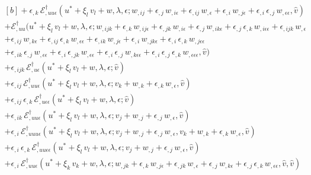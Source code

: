 \documentclass[12pt, final]{scrartcl}
\theoremstyle{definition}
\newcommand{\EE}{\mathcal E ^ \dagger}
\begin{document}
\begin{equation}
\begin{aligned}[b]
    + \epsilon_{,k} \, \EE_{,uu\epsilon}(u^\ast + \xi_l \, v_l + w, \lambda, \epsilon; w_{,ij} + \epsilon_{,j} \, w_{,i\epsilon} + \epsilon_{,ij} \, w_{,\epsilon} + \epsilon_{,i} \, w_{,j\epsilon} + \epsilon_{,i} \, \epsilon_{,j} \, w_{,\epsilon\epsilon} , \hat{v})&\\
    + \EE_{,uu}(u^\ast + \xi_l \, v_l + w, \lambda, \epsilon; w_{,ijk} + \epsilon_{,k} \, w_{,ij\epsilon}+ \epsilon_{,jk} \, w_{,i\epsilon} + \epsilon_{,j} \, w_{,ik\epsilon} + \epsilon_{,j} \, \epsilon_{,k} \, w_{,i\epsilon\epsilon} + \epsilon_{,ijk} \, w_{,\epsilon} &\\
    + \epsilon_{,ij} \, w_{,k\epsilon} + \epsilon_{,ij} \, \epsilon_{,k} \, w_{,\epsilon\epsilon} + \epsilon_{,ik} \, w_{,j\epsilon} + \epsilon_{,i} \, w_{,jk\epsilon} + \epsilon_{,i} \, \epsilon_{,k} \, w_{,j\epsilon\epsilon} &\\+ \epsilon_{,ik} \, \epsilon_{,j} \, w_{,\epsilon\epsilon} + \epsilon_{,i} \, \epsilon_{,jk} \, w_{,\epsilon\epsilon} + \epsilon_{,i} \, \epsilon_{,j} \, w_{,k\epsilon\epsilon} + \epsilon_{,i} \, \epsilon_{,j} \, \epsilon_{,k} \, w_{,\epsilon\epsilon\epsilon}, \hat{v})&\\
    + \epsilon_{,ijk} \, \EE_{,u\epsilon}(u^\ast + \xi_l \, v_l + w, \lambda, \epsilon; \hat{v})&\\
    + \epsilon_{,ij} \, \EE_{,uu\epsilon}(u^\ast + \xi_l \, v_l + w, \lambda, \epsilon; v_k + w_{,k} + \epsilon_{,k} \, w_{,\epsilon}, \hat{v})&\\
    + \epsilon_{,ij} \, \epsilon_{,k} \, \EE_{,u\epsilon\epsilon}(u^\ast + \xi_l \, v_l + w, \lambda, \epsilon; \hat{v})&\\
    + \epsilon_{,ik} \, \EE_{,uu\epsilon}(u^\ast + \xi_l \, v_l + w, \lambda, \epsilon; v_j + w_{,j} + \epsilon_{,j} \, w_{,\epsilon}, \hat{v})&\\
    + \epsilon_{,i} \, \EE_{,uuu\epsilon}(u^\ast + \xi_l \, v_l + w, \lambda, \epsilon; v_j + w_{,j} + \epsilon_{,j} \, w_{,\epsilon}, v_k + w_{,k} + \epsilon_{,k} \, w_{,\epsilon}, \hat{v})&\\
    + \epsilon_{,i} \, \epsilon_{,k} \, \EE_{,uu\epsilon\epsilon}(u^\ast + \xi_l \, v_l + w, \lambda, \epsilon; v_j + w_{,j} + \epsilon_{,j} \, w_{,\epsilon}, \hat{v})&\\
    + \epsilon_{,i} \, \EE_{,uu\epsilon}(u^\ast + \xi_k \, v_k + w, \lambda, \epsilon; w_{,jk} + \epsilon_{,k} \, w_{,j\epsilon} + \epsilon_{,jk} \,  w_{,\epsilon} + \epsilon_{,j} \,  w_{,k\epsilon} + \epsilon_{,j} \, \epsilon_{,k}\,  w_{,\epsilon\epsilon}, \hat{v}, \hat{v})&\\

\end{aligned}
\end{equation}
\end{document}
